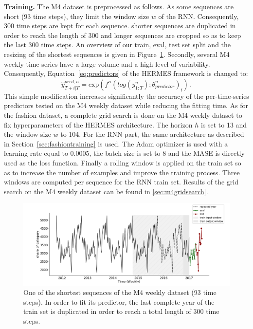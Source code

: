 \documentclass[review]{elsarticle}
\newcommand{\ts}{y}
\newcommand{\tspred}{\widehat{\ts}}
\newcommand{\stat}{f}
\newcommand{\statparam}{\theta_{predictor}}
\begin{document}
\textbf{Training. }
The M4 dataset is preprocessed as follows. As some sequences are short (93 time steps), they limit the window size $w$ of the RNN.  
Consequently, 300 time steps are kept for each sequence. shorter sequences are duplicated in order to reach the length of 300 and longer sequences are cropped so as to keep the last 300 time steps. An overview of our train, eval, test set split and the resizing of the shortest sequences is given in Figure~\ref{fig:m4dataset}. Secondly, several M4 weekly time series have a large volume and a high level of variability. Consequently, Equation~\ref{eq:predictors} of the HERMES framework is changed to:
\begin{equation}
    \tspred^{pred,n}_{T+i|T} =\mbox{exp}\left( \stat^n(log\left(\ts^n_{1:T}\right);\statparam^n)_i\right)\,.
\end{equation}
This simple modification increases significantly the accuracy of the per-time-series predictors tested on the M4 weekly dataset while reducing the fitting time. As for the fashion dataset, a complete grid search is done on the M4 weekly dataset to fix hyperparameters of the HERMES architecture. The horizon $h$ is set to 13 and the window size $w$ to 104. For the RNN part, the same architecture as described in Section~\ref{sec:fashiontraining} is used. The Adam optimizer is used with a learning rate equal to  0.0005, the batch size is set to 8 and the MASE is directly used as the loss function. Finally a rolling window is applied on the train set so as to increase the number of examples and improve the training process. Three windows are computed per sequence for the RNN train set. Results of the grid search on the M4 weekly dataset can be found in \ref{sec:m4gridsearch}.

\begin{figure}
  \centering
    \includegraphics[width=1.\linewidth]{M4_dataset}
  \caption{One of the shortest sequences of the M4 weekly dataset (93 time steps). In order to fit its predictor, the last complete year of the train set is duplicated in order to reach a total length of 300 time steps.}
\label{fig:m4dataset}
\end{figure}
\end{document}
